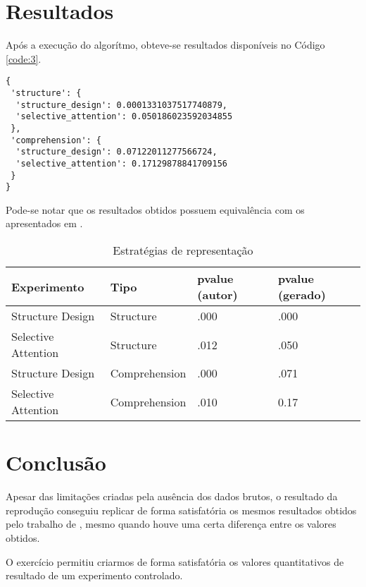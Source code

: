 \documentclass[12pt]{article}
\begin{document}
\section{Resultados}

Após a execução do algorítmo, obteve-se resultados disponíveis no Código \ref{code:3}.

\begin{lstlisting}[caption={Resultados Obtidos},captionpos=b,frame=single,label={code:3}]
{
 'structure': {
  'structure_design': 0.0001331037517740879,
  'selective_attention': 0.050186023592034855
 },
 'comprehension': {
  'structure_design': 0.07122011277566724,
  'selective_attention': 0.17129878841709156
 }
}
\end{lstlisting}

Pode-se notar que os resultados obtidos possuem equivalência com os apresentados em \cite{JIN2013248}.

\begin{table}[!htb]
  \centering
	\begin{tabular}{|l|l|l|l|}
		\hline
		\textbf{Experimento} & \textbf{Tipo} & \textbf{pvalue (autor)} & \textbf{pvalue (gerado)} \\ \hline
		Structure Design & Structure & .000 & .000 \\ \hline
		Selective Attention & Structure & .012 & .050 \\ \hline
		Structure Design & Comprehension & .000 & .071 \\ \hline
		Selective Attention & Comprehension & .010 & 0.17 \\ \hline
		\end{tabular}
  \caption{Estratégias de representação}
  \label{tab:estrategias_representacao}
\end{table}

\section{Conclusão}

Apesar das limitações criadas pela ausência dos dados brutos, o resultado da reprodução conseguiu replicar de forma satisfatória os mesmos resultados obtidos pelo trabalho de \cite{JIN2013248}, mesmo quando houve uma certa diferença entre os valores obtidos.

O exercício permitiu criarmos de forma satisfatória os valores quantitativos de resultado de um experimento controlado.



\end{document}
